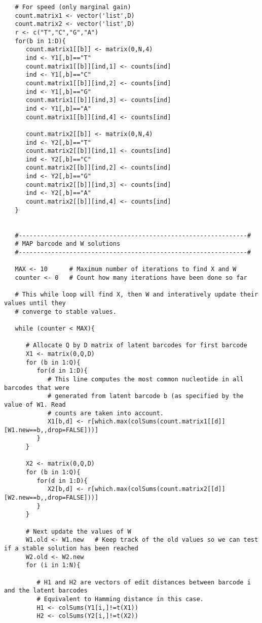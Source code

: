 \begin{footnotesize}
\begin{lstlisting}
   # For speed (only marginal gain)
   count.matrix1 <- vector('list',D)
   count.matrix2 <- vector('list',D)
   r <- c("T","C","G","A")
   for(b in 1:D){
      count.matrix1[[b]] <- matrix(0,N,4)
      ind <- Y1[,b]=="T"
      count.matrix1[[b]][ind,1] <- counts[ind]
      ind <- Y1[,b]=="C"
      count.matrix1[[b]][ind,2] <- counts[ind]
      ind <- Y1[,b]=="G"
      count.matrix1[[b]][ind,3] <- counts[ind]
      ind <- Y1[,b]=="A"
      count.matrix1[[b]][ind,4] <- counts[ind]
      
      count.matrix2[[b]] <- matrix(0,N,4)
      ind <- Y2[,b]=="T"
      count.matrix2[[b]][ind,1] <- counts[ind]
      ind <- Y2[,b]=="C"
      count.matrix2[[b]][ind,2] <- counts[ind]
      ind <- Y2[,b]=="G"
      count.matrix2[[b]][ind,3] <- counts[ind]
      ind <- Y2[,b]=="A"
      count.matrix2[[b]][ind,4] <- counts[ind]
   }
   
   
   #---------------------------------------------------------------#
   # MAP barcode and W solutions
   #---------------------------------------------------------------#
   
   MAX <- 10      # Maximum number of iterations to find X and W
   counter <- 0   # Count how many iterations have been done so far
   
   # This while loop will find X, then W and interatively update their values until they
   # converge to stable values.
   
   while (counter < MAX){
      
      # Allocate Q by D matrix of latent barcodes for first barcode
      X1 <- matrix(0,Q,D)
      for (b in 1:Q){
         for(d in 1:D){
            # This line computes the most common nucleotide in all barcodes that were 
            # generated from latent barcode b (as specified by the value of W1. Read 
            # counts are taken into account.
            X1[b,d] <- r[which.max(colSums(count.matrix1[[d]][W1.new==b,,drop=FALSE]))]
         }
      }
      
      X2 <- matrix(0,Q,D)
      for (b in 1:Q){
         for(d in 1:D){
            X2[b,d] <- r[which.max(colSums(count.matrix2[[d]][W2.new==b,,drop=FALSE]))]
         }
      }
      
      # Next update the values of W
      W1.old <- W1.new   # Keep track of the old values so we can test if a stable solution has been reached
      W2.old <- W2.new
      for (i in 1:N){
         
         # H1 and H2 are vectors of edit distances between barcode i and the latent barcodes
         # Equivalent to Hamming distance in this case.
         H1 <- colSums(Y1[i,]!=t(X1))
         H2 <- colSums(Y2[i,]!=t(X2))
         

\end{lstlisting}
\end{footnotesize}

